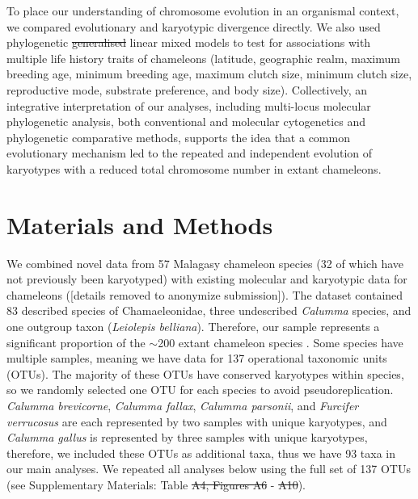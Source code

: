 \documentclass[a4paper, 12pt]{article}
\providecommand{\DIFadd}[1]{{\protect\color{blue}\uwave{#1}}} %
\providecommand{\DIFdel}[1]{{\protect\color{red}\sout{#1}}}                      %
\providecommand{\DIFaddbegin}{} %
\providecommand{\DIFaddend}{} %
\providecommand{\DIFdelbegin}{} %
\providecommand{\DIFdelend}{} %
\newcommand{\DIFscaledelfig}{0.5}
\newlength{\DIFdelgraphicswidth} %
\newlength{\DIFdelgraphicsheight} %
\newcommand{\DIFaddincludegraphics}[2][]{{\color{blue}\fbox{\DIFOincludegraphics[#1]{#2}}}} %
\newcommand{\DIFdelincludegraphics}[2][]{%
\sbox{\DIFdelgraphicsbox}{\DIFOincludegraphics[#1]{#2}}%
\settoboxwidth{\DIFdelgraphicswidth}{\DIFdelgraphicsbox} %
\settoboxtotalheight{\DIFdelgraphicsheight}{\DIFdelgraphicsbox} %
\scalebox{\DIFscaledelfig}{%
\parbox[b]{\DIFdelgraphicswidth}{\usebox{\DIFdelgraphicsbox}\\[-\baselineskip] \rule{\DIFdelgraphicswidth}{0em}}\llap{\resizebox{\DIFdelgraphicswidth}{\DIFdelgraphicsheight}{%
\setlength{\unitlength}{\DIFdelgraphicswidth}%
\begin{picture}(1,1)%
\thicklines\linethickness{2pt} %
{\color[rgb]{1,0,0}\put(0,0){\framebox(1,1){}}}%
{\color[rgb]{1,0,0}\put(0,0){\line( 1,1){1}}}%
{\color[rgb]{1,0,0}\put(0,1){\line(1,-1){1}}}%
\end{picture}%
}\hspace*{3pt}}} %
} %
\DeclareRobustCommand{\DIFaddbegin}{\DIFOaddbegin \let\includegraphics\DIFaddincludegraphics} %
\DeclareRobustCommand{\DIFaddend}{\DIFOaddend \let\includegraphics\DIFOincludegraphics} %
\DeclareRobustCommand{\DIFdelbegin}{\DIFOdelbegin \let\includegraphics\DIFdelincludegraphics} %
\DeclareRobustCommand{\DIFdelend}{\DIFOaddend \let\includegraphics\DIFOincludegraphics} %
\begin{document}
To place our understanding of chromosome evolution in an organismal context, we compared evolutionary and karyotypic divergence directly. 
We also used phylogenetic \DIFdelbegin \DIFdel{generalised }\DIFdelend \DIFaddbegin \DIFadd{generalized }\DIFaddend linear mixed models to test for associations with multiple life history traits of chameleons (latitude, geographic realm, maximum breeding age, minimum breeding age, maximum clutch size, minimum clutch size, reproductive mode, substrate preference, and body size). 
Collectively, an integrative interpretation of our analyses, including multi-locus molecular phylogenetic analysis, both conventional and molecular cytogenetics and phylogenetic comparative methods, supports the idea that a common evolutionary mechanism led to the repeated and independent evolution of karyotypes with a reduced total chromosome number in extant chameleons.

\section{Materials and Methods}

We combined novel data from 57 Malagasy chameleon species (32 of which have not previously been karyotyped) with existing molecular and karyotypic data for chameleons ([details removed to anonymize submission]). 
The dataset contained 83 described species of Chamaeleonidae, three undescribed \textit{Calumma} species, and one outgroup taxon (\textit{Leiolepis belliana}). 
Therefore, our sample represents a significant proportion of the $\sim$200 extant chameleon species \citep{uetz2022}. 
Some species have multiple samples, meaning we have data for 137 operational taxonomic units (OTUs). 
The majority of these OTUs have conserved karyotypes within species, so we randomly selected one OTU for each species to avoid pseudoreplication.
\textit{Calumma brevicorne}, \textit{Calumma fallax}, \textit{Calumma parsonii}, and \textit{Furcifer verrucosus} are each represented by two samples with unique karyotypes, and \textit{Calumma gallus} is represented by three samples with unique karyotypes, therefore, we included these OTUs as additional taxa, thus we have 93 taxa in our main analyses. 
We repeated all analyses below using the full set of 137 OTUs (see Supplementary Materials: Table \DIFdelbegin \DIFdel{A4, Figures A6 }\DIFdelend \DIFaddbegin \DIFadd{A1, Figures A1 }\DIFaddend - \DIFdelbegin \DIFdel{A10}\DIFdelend \DIFaddbegin \DIFadd{A4}\DIFaddend ).
\end{document}
